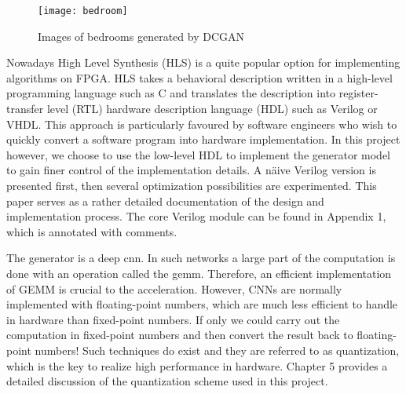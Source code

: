 \begin{figure}[h]
  \centering
  \texttt{[image: bedroom]}
  \caption{Images of bedrooms generated by DCGAN}
  \label{fig:bedroom}
\end{figure}

Nowadays High Level Synthesis (HLS) is a quite popular option for implementing algorithms on FPGA. HLS takes a
behavioral description written in a high-level programming language such as C and translates the description
into register-transfer level (RTL) hardware description language (HDL) such as Verilog or VHDL. This approach
is particularly favoured by software engineers who wish to quickly convert a software program into
hardware implementation. In this project however, we choose to use the low-level HDL to implement the
generator model to gain finer control of the implementation details. A näive Verilog version is presented
first, then several optimization possibilities are experimented. This paper serves as a rather detailed
documentation of the design and implementation process. The core Verilog module can be found in Appendix 1,
which is annotated with comments.

The generator is a deep \gls{cnn}. In such networks a large part of the computation is done with an
operation called the \gls{gemm}. Therefore, an efficient implementation of GEMM is crucial to the
acceleration. However, CNNs are normally implemented with floating-point numbers, which are much less
efficient to handle in hardware than fixed-point numbers. If only we could carry out the computation in
fixed-point numbers and then convert the result back to floating-point numbers! Such techniques do exist
and they are referred to as quantization, which is the key to realize high performance in hardware. Chapter 5
provides a detailed discussion of the quantization scheme used in this project.

\clearpage %
